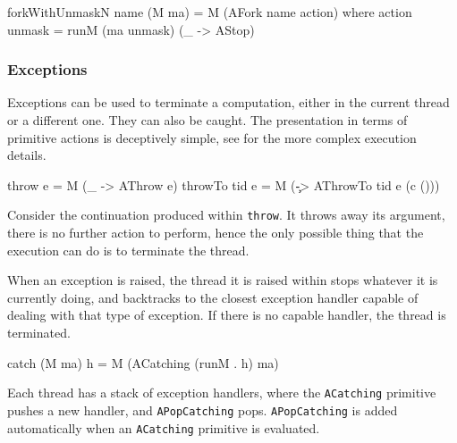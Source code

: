 \begin{haskellcode}
forkWithUnmaskN name (M ma) = M (AFork name action) where
  action unmask = runM (ma unmask) (\_ -> AStop)
\end{haskellcode}

\subsubsection{Exceptions}
\label{sec:execution-primops-exceptions}

Exceptions can be used to terminate a computation, either in the
current thread or a different one. They can also be caught. The
presentation in terms of primitive actions is deceptively simple, see
 for the more complex execution details.

\begin{haskellcode}
throw       e = M (\_ -> AThrow e)
throwTo tid e = M (\c -> AThrowTo tid e (c ()))
\end{haskellcode}


Consider the continuation produced within \verb|throw|. It throws away
its argument, there is no further action to perform, hence the only
possible thing that the execution can do is to terminate the thread.


When an exception is raised, the thread it is raised within stops
whatever it is currently doing, and backtracks to the closest
exception handler capable of dealing with that type of exception. If
there is no capable handler, the thread is terminated.

\begin{haskellcode}
catch (M ma) h = M (ACatching (runM . h) ma)
\end{haskellcode}


Each thread has a stack of exception handlers, where the
\verb|ACatching| primitive pushes a new handler, and
\verb|APopCatching| pops. \verb|APopCatching| is added automatically
when an \verb|ACatching| primitive is evaluated.


